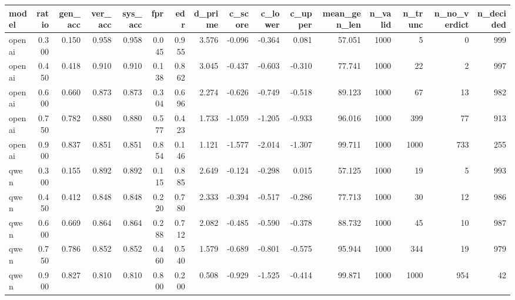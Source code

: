 \begin{tabular}{lrrrrrrrrrrrrrrr}
\toprule
model & ratio & gen_acc & ver_acc & sys_acc & fpr & edr & d_prime & c_score & c_lower & c_upper & mean_gen_len & n_valid & n_trunc & n_no_verdict & n_decided \\
\midrule
openai & 0.300 & 0.150 & 0.958 & 0.958 & 0.045 & 0.955 & 3.576 & -0.096 & -0.364 & 0.081 & 57.051 & 1000 & 5 & 0 & 999 \\
openai & 0.450 & 0.418 & 0.910 & 0.910 & 0.138 & 0.862 & 3.045 & -0.437 & -0.603 & -0.310 & 77.741 & 1000 & 22 & 2 & 997 \\
openai & 0.600 & 0.660 & 0.873 & 0.873 & 0.304 & 0.696 & 2.274 & -0.626 & -0.749 & -0.518 & 89.123 & 1000 & 67 & 13 & 982 \\
openai & 0.750 & 0.782 & 0.880 & 0.880 & 0.577 & 0.423 & 1.733 & -1.059 & -1.205 & -0.933 & 96.016 & 1000 & 399 & 77 & 913 \\
openai & 0.900 & 0.837 & 0.851 & 0.851 & 0.854 & 0.146 & 1.121 & -1.577 & -2.014 & -1.307 & 99.711 & 1000 & 1000 & 733 & 255 \\
qwen & 0.300 & 0.155 & 0.892 & 0.892 & 0.115 & 0.885 & 2.649 & -0.124 & -0.298 & 0.015 & 57.125 & 1000 & 19 & 5 & 993 \\
qwen & 0.450 & 0.412 & 0.848 & 0.848 & 0.220 & 0.780 & 2.333 & -0.394 & -0.517 & -0.286 & 77.713 & 1000 & 30 & 12 & 986 \\
qwen & 0.600 & 0.669 & 0.864 & 0.864 & 0.288 & 0.712 & 2.082 & -0.485 & -0.590 & -0.378 & 88.732 & 1000 & 45 & 10 & 987 \\
qwen & 0.750 & 0.786 & 0.852 & 0.852 & 0.460 & 0.540 & 1.579 & -0.689 & -0.801 & -0.575 & 95.944 & 1000 & 344 & 19 & 979 \\
qwen & 0.900 & 0.827 & 0.810 & 0.810 & 0.800 & 0.200 & 0.508 & -0.929 & -1.525 & -0.414 & 99.871 & 1000 & 1000 & 954 & 42 \\
\bottomrule
\end{tabular}
